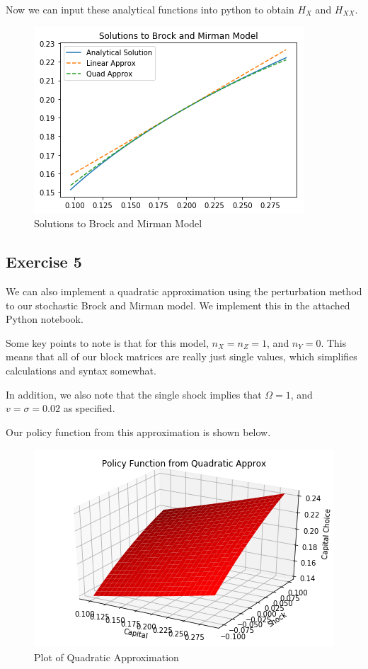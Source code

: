 \documentclass{article}
\begin{document}
	Now we can input these analytical functions into python to obtain $H_X$ and $H_{XX}$. 
	
	\begin{figure}[!h]
		\centering
		\caption{Solutions to Brock and Mirman Model}
		\includegraphics[scale=0.7]{figP4}
	\end{figure}
	
	\newpage
	\subsection*{Exercise 5}
	We can also implement a quadratic approximation using the perturbation method to our stochastic Brock and Mirman model. We implement this in the attached Python notebook.
	
	Some key points to note is that for this model, $n_X = n_Z = 1$, and $n_Y = 0$. This means that all of our block matrices are really just single values, which simplifies calculations and syntax somewhat. 
	
	In addition, we also note that the single shock implies that $\Omega = 1$, and $v = \sigma = 0.02$ as specified. 
	
	Our policy function from this approximation is shown below.
	\begin{figure}[!h]
		\centering
		\caption{Plot of Quadratic Approximation}
		\includegraphics[scale = 0.5]{figP5}
	\end{figure}
\end{document}
